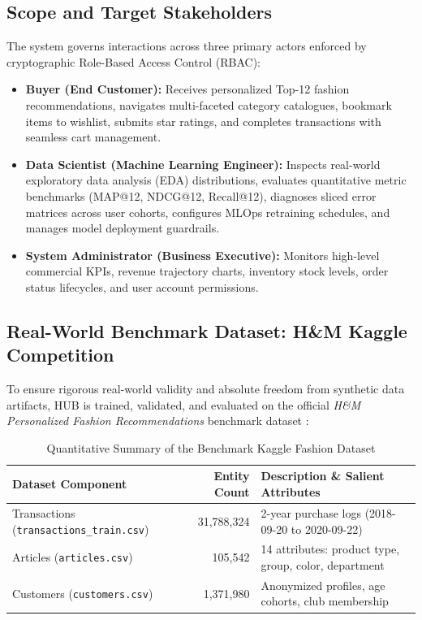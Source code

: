 \subsection{Scope and Target Stakeholders}
The system governs interactions across three primary actors enforced by cryptographic Role-Based Access Control (RBAC):
\begin{itemize}
    \item \textbf{Buyer (End Customer):} Receives personalized Top-12 fashion recommendations, navigates multi-faceted category catalogues, bookmark items to wishlist, submits star ratings, and completes transactions with seamless cart management.
    \item \textbf{Data Scientist (Machine Learning Engineer):} Inspects real-world exploratory data analysis (EDA) distributions, evaluates quantitative metric benchmarks (MAP@12, NDCG@12, Recall@12), diagnoses sliced error matrices across user cohorts, configures MLOps retraining schedules, and manages model deployment guardrails.
    \item \textbf{System Administrator (Business Executive):} Monitors high-level commercial KPIs, revenue trajectory charts, inventory stock levels, order status lifecycles, and user account permissions.
\end{itemize}

\subsection{Real-World Benchmark Dataset: H\&M Kaggle Competition}
To ensure rigorous real-world validity and absolute freedom from synthetic data artifacts, HUB is trained, validated, and evaluated on the official \textit{H\&M Personalized Fashion Recommendations} benchmark dataset \cite{hmkaggle2022}:
\begin{table}[H]
\centering
{}
\begin{tabular}{|l|r|l|}
\hline
\rowcolor{gray!20} \textbf{Dataset Component} & \textbf{Entity Count} & \textbf{Description \& Salient Attributes} \\ \hline
Transactions (\texttt{transactions\_train.csv}) & 31,788,324 & 2-year purchase logs (2018-09-20 to 2020-09-22) \\ \hline
Articles (\texttt{articles.csv}) & 105,542 & 14 attributes: product type, group, color, department \\ \hline
Customers (\texttt{customers.csv}) & 1,371,980 & Anonymized profiles, age cohorts, club membership \\ \hline
\end{tabular}
\caption{Quantitative Summary of the Benchmark Kaggle Fashion Dataset}
\label{tab:dataset_summary}
\end{table}

